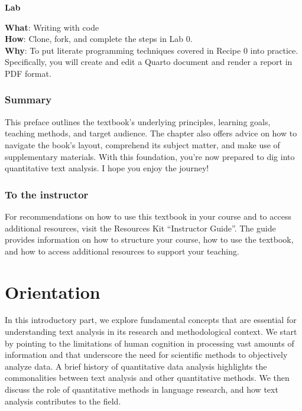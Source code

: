 \documentclass[
  letterpaper,
  krantz1]{latex/krantz-mod}
\theoremstyle{definition}
\theoremstyle{definition}
\theoremstyle{remark}
\begin{document}
\begin{tcolorbox}[enhanced jigsaw, toprule=.15mm, breakable, colback=white, arc=.35mm, left=2mm, colframe=quarto-callout-color-frame, opacityback=0, bottomrule=.15mm, rightrule=.15mm, leftrule=.75mm]

\textbf{ Lab}

\textbf{What}: Writing with code\\
\textbf{How}: Clone, fork, and complete the steps in Lab 0.\\
\textbf{Why}: To put literate programming techniques covered in Recipe 0
into practice. Specifically, you will create and edit a Quarto document
and render a report in PDF format.

\end{tcolorbox}

\section*{Summary}\label{sec-preface-summary}


This preface outlines the textbook's underlying principles, learning
goals, teaching methods, and target audience. The chapter also offers
advice on how to navigate the book's layout, comprehend its subject
matter, and make use of supplementary materials. With this foundation,
you're now prepared to dig into quantitative text analysis. I hope you
enjoy the journey!

\section*{To the instructor}\label{sec-preface-instructor}


For recommendations on how to use this textbook in your course and to
access additional resources, visit the Resources Kit ``Instructor
Guide''. The guide provides information on how to structure your course,
how to use the textbook, and how to access additional resources to
support your teaching.

\mainmatter

\part{Orientation}

In this introductory part, we explore fundamental concepts that are
essential for understanding text analysis in its research and
methodological context. We start by pointing to the limitations of human
cognition in processing vast amounts of information and that underscore
the need for scientific methods to objectively analyze data. A brief
history of quantitative data analysis highlights the commonalities
between text analysis and other quantitative methods. We then discuss
the role of quantitative methods in language research, and how text
analysis contributes to the field.
\end{document}
